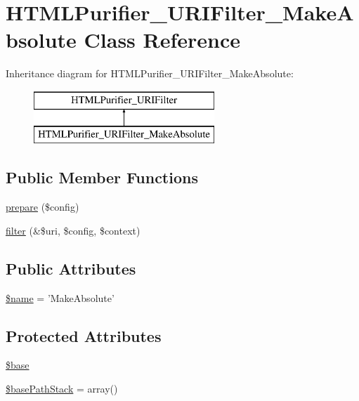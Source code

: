 \hypertarget{classHTMLPurifier__URIFilter__MakeAbsolute}{\section{H\+T\+M\+L\+Purifier\+\_\+\+U\+R\+I\+Filter\+\_\+\+Make\+Absolute Class Reference}
\label{classHTMLPurifier__URIFilter__MakeAbsolute}
}
Inheritance diagram for H\+T\+M\+L\+Purifier\+\_\+\+U\+R\+I\+Filter\+\_\+\+Make\+Absolute\+:\begin{figure}[H]
\begin{center}
\leavevmode
\includegraphics[height=2.000000cm]{classHTMLPurifier__URIFilter__MakeAbsolute}
\end{center}
\end{figure}
\subsection*{Public Member Functions}
\begin{DoxyCompactItemize}
\item 
\hyperlink{classHTMLPurifier__URIFilter__MakeAbsolute_a645e1fbcec41ee2b3fb42f8b9f16bb05}{prepare} (\$config)
\item 
\hyperlink{classHTMLPurifier__URIFilter__MakeAbsolute_abaaba3fd5ab5fc806b15cf06979a9122}{filter} (\&\$uri, \$config, \$context)
\end{DoxyCompactItemize}
\subsection*{Public Attributes}
\begin{DoxyCompactItemize}
\item 
\hyperlink{classHTMLPurifier__URIFilter__MakeAbsolute_a9beee269d7431813e481b3a13989540f}{\$name} = 'Make\+Absolute'
\end{DoxyCompactItemize}
\subsection*{Protected Attributes}
\begin{DoxyCompactItemize}
\item 
\hyperlink{classHTMLPurifier__URIFilter__MakeAbsolute_ab3693c07dd49f1919eaf36e274954ab8}{\$base}
\item 
\hyperlink{classHTMLPurifier__URIFilter__MakeAbsolute_a0b729e07ad059641fd5b45101b67a6ea}{\$base\+Path\+Stack} = array()
\end{DoxyCompactItemize}


